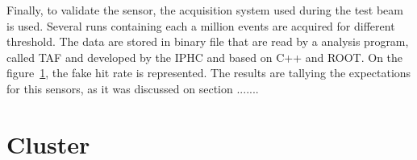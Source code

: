   Finally, to validate the sensor, the acquisition system used during the test beam is used.
  Several runs containing each a million events are acquired for different threshold. 
  The data are stored in binary file that are read by a analysis program, called TAF and developed by the IPHC and based on C++ and ROOT.
  On the figure~\ref{fig:FHR}, the fake hit rate is represented. 
  The results are tallying the expectations for this sensors, as it was discussed on section .......

  \begin{figure}
    \label{fig:FHR}
  \end{figure}

\section{Cluster}

  

  \begin{figure}
  \end{figure}
